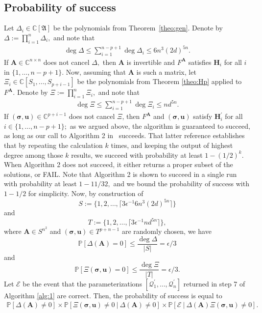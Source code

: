 \documentclass[a4paper]{article}
\def\A{\mathfrak{A}}
\def\mA{{\bm A}}
\def\ub{{\bm u}}
\def\D{\Delta}
\def\C{\mathbb{C}}
\def\pr{\mathbb{P}}
\begin{document}
\subsection{Probability of success} 
Let $\Delta_i \in \C[\A]$ be the polynomials from
Theorem~\ref{theo:gen}. Denote by $\Delta := \prod_{i=1}^n \D_i,$ and
note that
\begin{align}
    \deg \Delta \leq \sum_{i=1}^{n-p+1} \deg \Delta_i \leq 6n^3(2d)^{5n}.
\end{align}
If $\mA \in \C^{n \times n}$ does not cancel $\Delta,$ then $\mA$ is
invertible and $F^\mA$ satisfies $\textbf{H}_i$ for all $i$ in
$\{1,\hdots,n-p+1\}.$ Now, assuming that $\mA$ is such a matrix, let
$\Xi_i\in \C[S_1,\dots,S_{p+i-1}]$ be the polynomials from Theorem \ref{theo:Hp} applied to
$F^{\mA}.$ Denote by $\Xi := \prod_{i=1}^n \Xi_i,$ and note that
\begin{align}
    \deg \Xi \leq \sum_{i=1}^{n-p+1} \deg \Xi_i \leq nd^{5n}.
\end{align}
If $(\bm \sigma,\ub) \in \C^{p+i-1}$ does not cancel $\Xi$, then $F^{\mA}$ and
$(\bm \sigma,\ub)$ satisfy $\textbf{H}_i^{'}$ for all $i \in
\{1,\hdots,n-p+1\};$ as we argued above, the algorithm is guaranteed to
succeed, as long as our call to Algorithm 2 in~\cite{SH} succeeds. That latter reference establishes that by repeating the calculation $k$ times, and keeping the output of highest degree among those $k$ results, we succeed with probability at least $1-(1/2)^k$. When Algorithm 2 does not succeed, it either returns a proper subset of the solutions, or FAIL. Note that Algorithm 2 is shown to succeed in a single run with  probability at least $1-11/32,$ and we bound the probability of success with $1-1/2$ for simplicity. 
Now, by construction of
\[
S := \{1,2,\hdots,\lceil 3\epsilon^{-1}6n^3(2d)^{5n}\rceil \}
\] 
and 
\[
T := \{1,2,\hdots,\lceil 3\epsilon^{-1}nd^{5n} \rceil \},
\] 
where $\mA \in S^{n^2}$ and  $(\bm \sigma,\ub) \in T^{p+n-1}$ are randomly chosen, we have 
%
\[
\pr[\Delta(\mA)=0] \leq  \frac{\deg\Delta}{|S|} = \epsilon/3
\]
and
\[
\pr[\Xi(\bm \sigma,\ub)=0] \leq  \frac{\deg\Xi}{|T|} = \epsilon/3.
\]
Let $\mathscr{E}$ be the event that the parameterizations
$[\mathscr{Q}_1^{'},\hdots,\mathscr{Q}_n^{'}]$ returned in step 7 of
Algorithm \ref{alg:1} are correct. Then, the probability of success is equal to
\begin{align*}
 \pr[\Delta(\mA)\ne 0] \times \pr[\Xi(\bm \sigma,\ub)\ne 0 ~|~\Delta(\mA) \ne 0] \times \pr[\mathscr{E}~|~
   \Delta(\mA)\Xi(\bm \sigma,\ub) \ne 0].
\end{align*}
\end{document}
